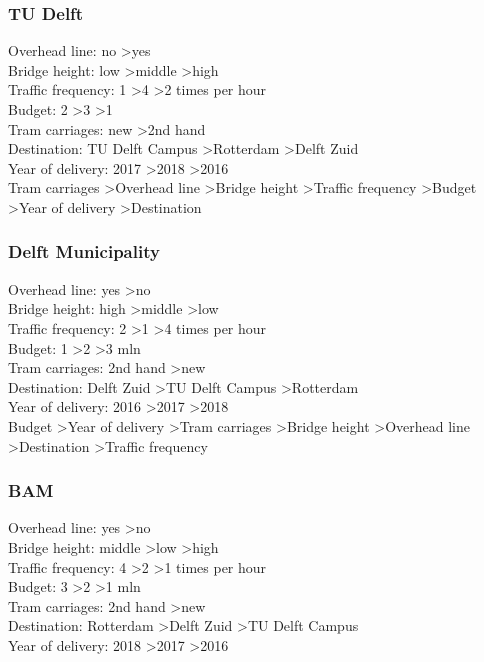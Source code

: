 \documentclass{article}
\begin{document}
\subsubsection*{TU Delft}
Overhead line: no \textgreater yes \\
Bridge height: low \textgreater middle \textgreater high \\
Traffic frequency: 1 \textgreater 4 \textgreater 2 times per hour \\
Budget: 2 \textgreater 3 \textgreater 1 \\
Tram carriages: new \textgreater 2nd hand \\
Destination: TU Delft Campus \textgreater Rotterdam \textgreater Delft Zuid \\
Year of delivery: 2017 \textgreater 2018 \textgreater 2016 \\

Tram carriages \textgreater Overhead line \textgreater Bridge height \textgreater Traffic frequency \textgreater Budget \textgreater Year of delivery \textgreater Destination\\


\subsubsection*{Delft Municipality}
Overhead line: yes \textgreater no \\
Bridge height: high \textgreater middle \textgreater low \\
Traffic frequency: 2 \textgreater 1 \textgreater 4 times per hour \\
Budget: 1 \textgreater 2 \textgreater 3 mln \\
Tram carriages: 2nd hand \textgreater new \\
Destination: Delft Zuid \textgreater TU Delft Campus \textgreater Rotterdam \\
Year of delivery: 2016 \textgreater 2017 \textgreater 2018 \\

Budget \textgreater Year of delivery \textgreater Tram carriages \textgreater Bridge height \textgreater Overhead line \textgreater Destination \textgreater Traffic frequency\\


\subsubsection*{BAM}
Overhead line: yes \textgreater no \\
Bridge height: middle \textgreater low \textgreater high \\
Traffic frequency: 4 \textgreater 2 \textgreater 1 times per hour \\
Budget: 3 \textgreater 2 \textgreater 1 mln \\
Tram carriages: 2nd hand \textgreater new \\
Destination: Rotterdam \textgreater Delft Zuid \textgreater TU Delft Campus \\
Year of delivery: 2018 \textgreater 2017 \textgreater 2016 \\
\end{document}
